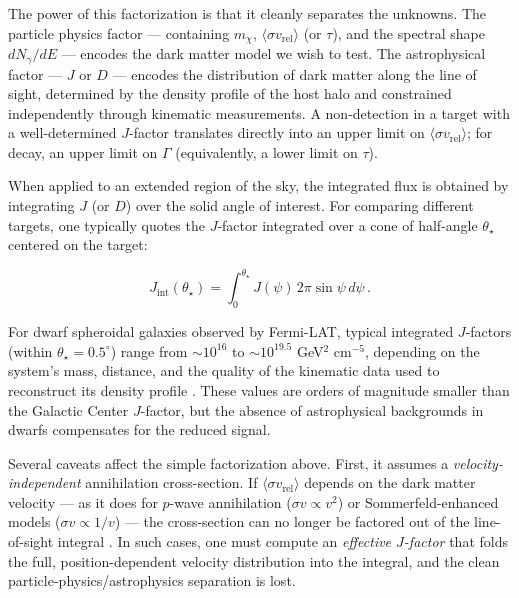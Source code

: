 The power of this factorization is that it cleanly separates the unknowns.
The particle physics factor --- containing $m_\chi$, $\langle \sigma v_\text{rel} \rangle$ (or $\tau$), and the spectral shape $dN_\gamma/dE$ --- encodes the dark matter model we wish to test.
The astrophysical factor --- $J$ or $D$ --- encodes the distribution of dark matter along the line of sight, determined by the density profile of the host halo and constrained independently through kinematic measurements.
A non-detection in a target with a well-determined $J$-factor translates directly into an upper limit on $\langle \sigma v_\text{rel} \rangle$; for decay, an upper limit on $\Gamma$ (equivalently, a lower limit on $\tau$).

When applied to an extended region of the sky, the integrated flux is obtained by integrating $J$ (or $D$) over the solid angle of interest.
For comparing different targets, one typically quotes the $J$-factor integrated over a cone of half-angle $\theta_\star$ centered on the target:

\begin{equation}
	J_\text{int}(\theta_\star) = \int_0^{\theta_\star} J(\psi) \, 2\pi \sin\psi \, d\psi \,.
	\label{eq:jfactor_int}
\end{equation}

For dwarf spheroidal galaxies observed by Fermi-LAT, typical integrated $J$-factors (within $\theta_\star = 0.5^\circ$) range from $\sim 10^{16}$ to $\sim 10^{19.5}$ GeV$^2$ cm$^{-5}$, depending on the system's mass, distance, and the quality of the kinematic data used to reconstruct its density profile \cite{Hooper:2024,Cirelli:2024ssz,Bonnivard:2015xpq}.
These values are orders of magnitude smaller than the Galactic Center $J$-factor, but the absence of astrophysical backgrounds in dwarfs compensates for the reduced signal.

Several caveats affect the simple factorization above.
First, it assumes a \textit{velocity-independent} annihilation cross-section.
If $\langle \sigma v_\text{rel} \rangle$ depends on the dark matter velocity --- as it does for $p$-wave annihilation ($\sigma v \propto v^2$) or Sommerfeld-enhanced models ($\sigma v \propto 1/v$) --- the cross-section can no longer be factored out of the line-of-sight integral \cite{Cirelli:2024ssz}.
In such cases, one must compute an \textit{effective $J$-factor} that folds the full, position-dependent velocity distribution into the integral, and the clean particle-physics/astrophysics separation is lost.

